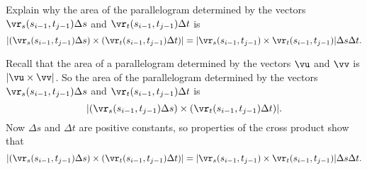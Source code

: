 \begin{activity} \label{A:11.6.3} Explain why the area of the parallelogram determined by the vectors $\vr_s(s_{i-1},t_{j-1}) \Delta s$ and $\vr_t(s_{i-1},t_{j-1}) \Delta t$ is
\begin{equation} \label{eq:11.6.parallelogram_area}
|(\vr_s(s_{i-1},t_{j-1}) \Delta s) \times (\vr_t(s_{i-1},t_{j-1}) \Delta t)| = |\vr_s(s_{i-1},t_{j-1}) \times \vr_t(s_{i-1},t_{j-1})| \Delta s \Delta t.
\end{equation}

\end{activity}
\begin{smallhint}

\end{smallhint}
\begin{bighint}

\end{bighint}
\begin{activitySolution}
Recall that the area of a parallelogram determined by the vectors $\vu$ and $\vv$ is $| \vu \times \vv|$. So the area of the parallelogram determined by the vectors $\vr_s(s_{i-1},t_{j-1}) \Delta s$ and $\vr_t(s_{i-1},t_{j-1}) \Delta t$ is
\[|(\vr_s(s_{i-1},t_{j-1}) \Delta s) \times (\vr_t(s_{i-1},t_{j-1}) \Delta t)|.\]
Now $\Delta s$ and $\Delta t$ are positive constants, so properties of the cross product show that 
\[|(\vr_s(s_{i-1},t_{j-1}) \Delta s) \times (\vr_t(s_{i-1},t_{j-1}) \Delta t)| = |\vr_s(s_{i-1},t_{j-1}) \times \vr_t(s_{i-1},t_{j-1})| \Delta s \Delta t.\]
\end{activitySolution}
\aftera
